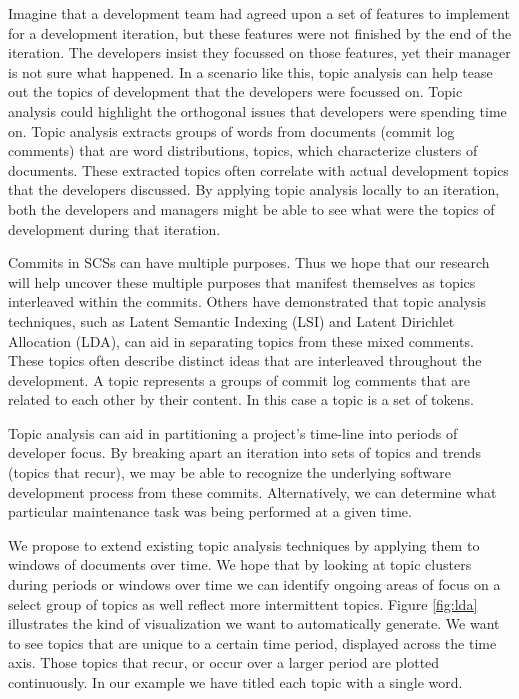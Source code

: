 \documentclass[times, 10pt,twocolumn]{article}
\begin{document}
Imagine that a development team had agreed upon a set of features to
implement for a development iteration, but these features were not
finished by the end of the iteration. The developers insist they
focussed on those features, yet their manager is not sure what
happened. In a scenario like this, topic analysis can help tease out
the topics of development that the developers were focussed on. Topic
analysis could highlight the orthogonal issues that developers were
spending time on.  Topic analysis extracts groups of words from
documents (commit log comments) that are word distributions, topics,
which characterize clusters of documents. These extracted topics often
correlate with actual development topics that the developers
discussed. By applying topic analysis locally to an iteration, both
the developers and managers might be able to see what were the topics
of development during that iteration. %


Commits in SCSs can have
multiple purposes. Thus we hope that our research will help uncover
these multiple purposes that manifest themselves as topics interleaved
within the commits.  Others have demonstrated that 
topic analysis techniques, such as Latent Semantic Indexing (LSI) and
Latent Dirichlet Allocation (LDA), can aid in separating topics from
these mixed comments. These topics often describe distinct ideas that
are interleaved throughout the development. A topic represents a
groups of commit log comments that are related to each other by their
content.  In this case a topic is a set of tokens. 



Topic analysis can aid in partitioning a project's
time-line into periods of developer focus. By breaking apart an
iteration into sets of topics and trends (topics that recur), we may
be able to recognize the underlying software development process from
these commits. Alternatively, we can determine what particular
maintenance task was being performed at a given time.

We propose to extend existing topic analysis techniques by
applying them to windows of documents over time. We hope that by
looking %
at topic clusters during periods or windows over time we can identify
ongoing areas of focus on a select group of topics as well reflect more intermittent topics. Figure \ref{fig:lda} illustrates
the kind of visualization we want to automatically generate. We want
to see topics that are unique to a certain time period, displayed
across the time axis. Those topics that recur, or occur over a
larger period are plotted continuously. In our example we have
titled each topic with a single word.
\end{document}

